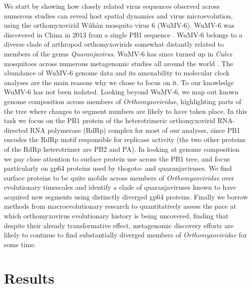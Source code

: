 \documentclass[11pt]{article}
\begin{document}
We start by showing how closely related virus sequences observed across numerous studies can reveal host spatial dynamics and virus microevolution, using the orthomyxovirid W\v{u}h\`{a}n mosquito virus 6 (WuMV-6).
WuMV-6 was discovered in China in 2013 from a single PB1 sequence \citep{li_unprecedented_2015}.
WuMV-6 belongs to a diverse clade of arthropod orthomyxovirids somewhat distantly related to members of the genus \textit{Quaranjavirus}.
WuMV-6 has since turned up in \textit{Culex} mosquitoes across numerous metagenomic studies all around the world \citep{shi_high-resolution_2017,pettersson_meta-transcriptomic_2019,batson_single_2021}.
The abundance of WuMV-6 genome data and its amenability to molecular clock analyses are the main reasons why we chose to focus on it.
To our knowledge WuMV-6 has not been isolated.
Looking beyond WuMV-6, we map out known genome composition across members of \textit{Orthomyxoviridae}, highlighting parts of the tree where changes to segment numbers are likely to have taken place.
In this task we focus on the PB1 protein of the heterotrimeric orthomyxovirid RNA-directed RNA polymerase (RdRp) complex for most of our analyses, since PB1 encodes the RdRp motif responsible for replicase activity (the two other proteins of the RdRp heterotrimer are PB2 and PA).
In looking at genome composition we pay close attention to surface protein use across the PB1 tree, and focus particularly on gp64 proteins used by thogoto- and quaranjaviruses.
We find surface proteins to be quite mobile across members of \textit{Orthomyxoviridae} over evolutionary timescales and identify a clade of quaranjaviruses known to have acquired new segments using distinctly diverged gp64 proteins.
Finally we borrow methods from macroevolutionary research to quantitatively assess the pace at which orthomyxovirus evolutionary history is being uncovered, finding that despite their already transformative effect, metagenomic discovery efforts are likely to continue to find substantially diverged members of \textit{Orthomyxoviridae} for some time.



\section{Results}
\end{document}
